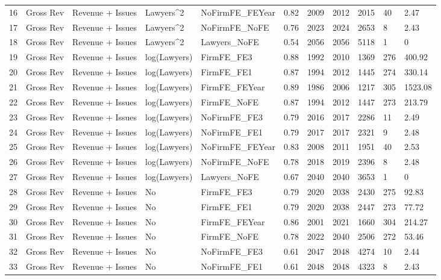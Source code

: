 \documentclass{article}
\begin{document}
\begin{table}[H]
\begin{tabular}{rllllllllll}
  16 & Gross Rev & Revenue + Issues & Lawyers^2 & NoFirmFE\_FEYear & 0.82 & 2009 & 2012 & 2015 & 40 & 2.47 \\ 
  17 & Gross Rev & Revenue + Issues & Lawyers^2 & NoFirmFE\_NoFE & 0.76 & 2023 & 2024 & 2653 & 8 & 2.43 \\ 
  18 & Gross Rev & Revenue + Issues & Lawyers^2 & Lawyers\_NoFE & 0.54 & 2056 & 2056 & 5118 & 1 & 0 \\ 
  19 & Gross Rev & Revenue + Issues & log(Lawyers) & FirmFE\_FE3 & 0.88 & 1992 & 2010 & 1369 & 276 & 400.92 \\ 
  20 & Gross Rev & Revenue + Issues & log(Lawyers) & FirmFE\_FE1 & 0.87 & 1994 & 2012 & 1445 & 274 & 330.14 \\ 
  21 & Gross Rev & Revenue + Issues & log(Lawyers) & FirmFE\_FEYear & 0.89 & 1986 & 2006 & 1217 & 305 & 1523.08 \\ 
  22 & Gross Rev & Revenue + Issues & log(Lawyers) & FirmFE\_NoFE & 0.87 & 1994 & 2012 & 1447 & 273 & 213.79 \\ 
  23 & Gross Rev & Revenue + Issues & log(Lawyers) & NoFirmFE\_FE3 & 0.79 & 2016 & 2017 & 2286 & 11 & 2.49 \\ 
  24 & Gross Rev & Revenue + Issues & log(Lawyers) & NoFirmFE\_FE1 & 0.79 & 2017 & 2017 & 2321 & 9 & 2.48 \\ 
  25 & Gross Rev & Revenue + Issues & log(Lawyers) & NoFirmFE\_FEYear & 0.83 & 2008 & 2011 & 1951 & 40 & 2.53 \\ 
  26 & Gross Rev & Revenue + Issues & log(Lawyers) & NoFirmFE\_NoFE & 0.78 & 2018 & 2019 & 2396 & 8 & 2.48 \\ 
  27 & Gross Rev & Revenue + Issues & log(Lawyers) & Lawyers\_NoFE & 0.67 & 2040 & 2040 & 3653 & 1 & 0 \\ 
  28 & Gross Rev & Revenue + Issues & No & FirmFE\_FE3 & 0.79 & 2020 & 2038 & 2430 & 275 & 92.83 \\ 
  29 & Gross Rev & Revenue + Issues & No & FirmFE\_FE1 & 0.79 & 2020 & 2038 & 2447 & 273 & 77.72 \\ 
  30 & Gross Rev & Revenue + Issues & No & FirmFE\_FEYear & 0.86 & 2001 & 2021 & 1660 & 304 & 214.27 \\ 
  31 & Gross Rev & Revenue + Issues & No & FirmFE\_NoFE & 0.78 & 2022 & 2040 & 2506 & 272 & 53.46 \\ 
  32 & Gross Rev & Revenue + Issues & No & NoFirmFE\_FE3 & 0.61 & 2047 & 2048 & 4274 & 10 & 2.44 \\ 
  33 & Gross Rev & Revenue + Issues & No & NoFirmFE\_FE1 & 0.61 & 2048 & 2048 & 4323 & 8 & 2.43 \\ 

\end{tabular}
\end{table}
\end{document}
